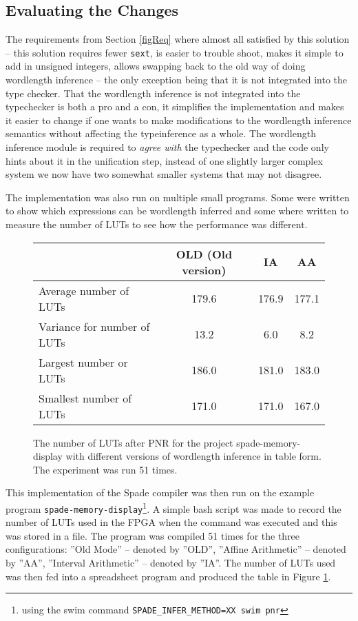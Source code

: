 \subsection{Evaluating the Changes}
The requirements from Section \ref{figReq} where almost all satisfied by this solution -- this solution requires fewer \verb+sext+, is easier to trouble shoot, makes it simple to add in unsigned integers, allows swapping back to the old way of doing wordlength inference -- the only exception being that it is not integrated into the type checker. That the wordlength inference is not integrated into the typechecker is both a pro and a con, it simplifies the implementation and makes it easier to change if one wants to make modifications to the wordlength inference semantics without affecting the typeinference as a whole. The wordlength inference module is required to \textit{agree with} the typechecker and the code only hints about it in the unification step, instead of one slightly larger complex system we now have two somewhat smaller systems that may not disagree.

The implementation was also run on multiple small programs. Some were written to show which expressions can be wordlength inferred and some where written to measure the number of LUTs to see how the performance was different. 

\begin{figure}[h!]
\begin{center}
\begin{tabular}{l | c c c}
  & OLD (Old version) & IA & AA \\
\hline
Average number of LUTs&179.6&176.9 & 177.1 \\
Variance for number of LUTs &13.2&6.0&8.2 \\
Largest number or LUTs&186.0&181.0&183.0 \\
Smallest number of LUTs&171.0&171.0&167.0 \\
\end{tabular}
  \caption{The number of LUTs after PNR for the project spade-memory-display with different versions of wordlength inference in table form. The experiment was run 51 times.}
  \label{fig:SpadeCompilations50Table}
\end{center}
\end{figure}

This implementation of the Spade compiler was then run on the example program \verb+spade-memory-display+\cprotect\footnote{using the swim command \verb+SPADE_INFER_METHOD=XX swim pnr+}. A simple bash script was made to record the number of LUTs used in the FPGA when the command was executed and this was stored in a file. The program was compiled 51 times for the three configurations: ''Old Mode'' -- denoted by ''OLD'', ''Affine Arithmetic'' -- denoted by ''AA'', ''Interval Arithmetic'' -- denoted by ''IA''. The number of LUTs used was then fed into a spreadsheet program and produced the table in Figure \ref{fig:SpadeCompilations50Table}.

